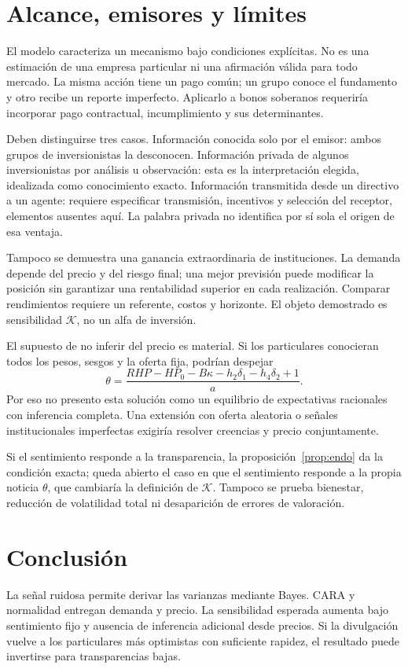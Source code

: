 \documentclass[11pt]{article}
\newcommand{\K}{\mathcal K}
\begin{document}
\section{Alcance, emisores y límites}
El modelo caracteriza un mecanismo bajo condiciones explícitas. No es una
estimación de una empresa particular ni una afirmación válida para todo
mercado. La misma acción tiene un pago común; un grupo conoce el fundamento
y otro recibe un reporte imperfecto. Aplicarlo a bonos soberanos requeriría
incorporar pago contractual, incumplimiento y sus determinantes.

Deben distinguirse tres casos. Información conocida solo por el emisor:
ambos grupos de inversionistas la desconocen. Información privada de algunos
inversionistas por análisis u observación: esta es la interpretación elegida,
idealizada como conocimiento exacto. Información transmitida desde un
directivo a un agente: requiere especificar transmisión, incentivos y
selección del receptor, elementos ausentes aquí. La palabra privada no
identifica por sí sola el origen de esa ventaja.

Tampoco se demuestra una ganancia extraordinaria de instituciones. La
demanda depende del precio y del riesgo final; una mejor previsión puede
modificar la posición sin garantizar una rentabilidad superior en cada
realización. Comparar rendimientos requiere un referente, costos y horizonte.
El objeto demostrado es sensibilidad $\K$, no un alfa de inversión.

El supuesto de no inferir del precio es material. Si los particulares
conocieran todos los pesos, sesgos y la oferta fija, podrían despejar
\begin{equation}
 \theta=\frac{RHP-HP_0-B\kappa-h_2\delta_1-h_4\delta_2+1}{a}.
\end{equation}
Por eso no presento esta solución como un equilibrio de expectativas
racionales con inferencia completa. Una extensión con oferta aleatoria o
señales institucionales imperfectas exigiría resolver creencias y precio
conjuntamente.

Si el sentimiento responde a la transparencia, la
proposición~\ref{prop:endo} da la condición exacta; queda abierto el caso en
que el sentimiento responde a la propia noticia $\theta$, que cambiaría la
definición de $\K$. Tampoco se prueba bienestar, reducción de volatilidad
total ni desaparición de errores de valoración.

\section{Conclusión}
La señal ruidosa permite derivar las varianzas mediante Bayes.
CARA y normalidad entregan demanda y precio. La sensibilidad esperada
aumenta bajo sentimiento fijo y ausencia de inferencia adicional desde precios.
Si la divulgación vuelve a los particulares más optimistas con suficiente
rapidez, el resultado puede invertirse para transparencias bajas.
\label{endbody}
\clearpage


\clearpage
\appendix
\end{document}
